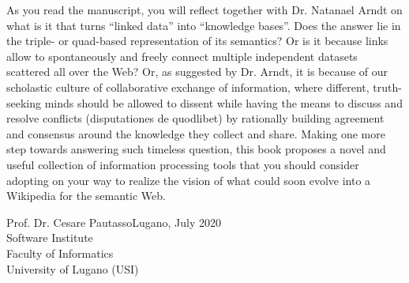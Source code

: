 As you read the manuscript, you will reflect together with Dr. Natanael Arndt on what is it that turns “linked data” into “knowledge bases”.
%
Does the answer lie in the triple- or quad-based representation of its semantics?
%
Or is it because links allow to spontaneously and freely connect multiple independent datasets scattered all over the Web?
%
Or, as suggested by Dr. Arndt, it is because of our scholastic culture of collaborative exchange of information, where different, truth-seeking minds should be allowed to dissent while having the means to discuss and resolve conflicts (disputationes de quodlibet) by rationally building agreement and consensus around the knowledge they collect and share.
%
Making one more step towards answering such timeless question, this book proposes a novel and useful collection of information processing tools that you should consider adopting
on your way to realize the vision of what could soon evolve into a Wikipedia for the semantic Web.

\vspace{1cm}

\noindent
Prof. Dr. Cesare Pautasso\hfill Lugano, July 2020\\
Software Institute\\
Faculty of Informatics\\
University of Lugano (USI)
